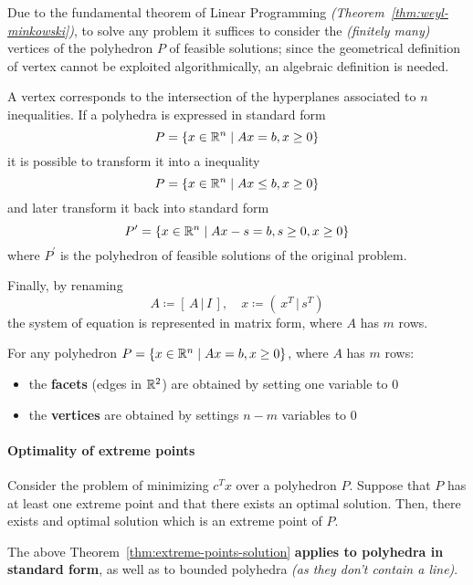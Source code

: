 \documentclass[english]{article}
\begin{document}
Due to the fundamental theorem of Linear Programming \textit{(Theorem~\ref{thm:weyl-minkowski})}, to solve any \LP problem it suffices to consider the \textit{(finitely many)} vertices of the polyhedron \(P\) of feasible solutions;
since the geometrical definition of vertex cannot be exploited algorithmically, an algebraic definition is needed.

A vertex corresponds to the intersection of the hyperplanes associated to \(n\) inequalities.
If a polyhedra is expressed in standard form
\[ P = \left\{ x \in \mathbb{R}^n \mid   Ax = b, x \geq 0 \right\}\]
it is possible to transform it into a inequality
\[ P = \left\{ x \in \mathbb{R}^n \mid   Ax \leq b, x \geq 0 \right\}\]
and later transform it back into standard form
\[ P^\prime = \left\{ x \in \mathbb{R}^n \mid   Ax -s = b, s \geq 0, x \geq 0 \right\} \]
where \(P^\prime\) is the polyhedron of feasible solutions of the original problem.

Finally, by renaming
\[ A \coloneqq \left[ \, A \,|\, I \, \right], \quad x \coloneqq \left( \, x^T \,|\, s^T \right) \]
the system of equation is represented in matrix form, where \(A\) has \(m\) rows.

\bigskip
\begin{property}
  For any polyhedron \(P = \left\{ x \in \mathbb{R}^n \mid   Ax = b, x \geq 0 \right\}\), where \(A\) has \(m\) rows:

  \begin{itemize}
    \item the \textbf{facets} (edges in \(\mathbb{R}^2\)) are obtained by setting one variable to \(0\)
    \item the \textbf{vertices} are obtained by settings \(n-m\) variables to \(0\)
  \end{itemize}
\end{property}

\paragraph{Optimality of extreme points}

\begin{theorem}
  Consider the \LP problem of minimizing \(c^T x\) over a polyhedron \(P\).
  Suppose that \(P\) has at least one extreme point and that there exists an optimal solution.
  Then, there exists and optimal solution which is an extreme point of \(P\).
  \label{thm:extreme-points-solution}
\end{theorem}

The above Theorem~\ref{thm:extreme-points-solution} \textbf{applies to polyhedra in standard form}, as well as to bounded polyhedra \textit{(as they don't contain a line)}.
\end{document}

